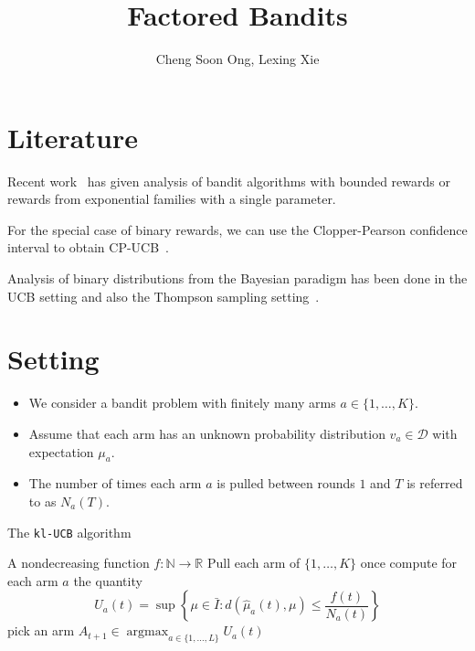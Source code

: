 \documentclass[a4paper,11pt]{article}
\title{Factored Bandits}
\author{Cheng Soon Ong, Lexing Xie}
\newcommand{\NN}{\mathbb{N}}
\newcommand{\RR}{\mathbb{R}}
\DeclareMathOperator{\argmax}{\mathrm{argmax}}
\newcommand{\muhat}{\widehat{\mu}}
\newcommand{\Dcal}{\mathcal{D}}
\begin{document}
\maketitle

\section{Literature}

Recent work~\cite{garivier11kluabs,maillard11finama,cappe13kulucb} has
given analysis of bandit algorithms with bounded rewards or rewards
from exponential families with a single parameter.

For the special case of binary rewards, we can use the Clopper-Pearson
confidence interval to obtain CP-UCB~\cite{garivier11kluabs}.

Analysis of binary distributions from the Bayesian paradigm has been
done in the UCB setting and also the Thompson sampling
setting~\cite{kaufmann12bayucb,kaufmann12thosao,korda13thosde}.


\section{Setting}

\begin{itemize}
\item We consider a bandit problem with finitely many arms
  $a\in\{1,\ldots,K\}$.
\item Assume that each arm has an unknown probability distribution
  $v_a\in\Dcal$ with expectation $\mu_a$.
\item The number of times each arm $a$ is pulled between rounds $1$
  and $T$ is referred to as $N_a(T)$.
\end{itemize}

\begin{algorithm}
  \label{alg:kl-UCB}
  \caption{The \texttt{kl-UCB} algorithm \cite[Algorithm 2]{cappe13kulucb}}
  \begin{algorithmic}
    \Require A nondecreasing function $f:\NN\to\RR$
    \State Pull each arm of $\{1, \ldots, K\}$ once
    \State compute for each arm $a$ the quantity
    \begin{equation}
      \label{eq:ucb}
      U_a(t) = \sup\left\{
        \mu\in\bar{I}: d(\muhat_a(t), \mu) \leqslant \frac{f(t)}{N_a(t)}
      \right\}
    \end{equation}
    \State pick an arm
    $A_{t+1}\in \argmax_{a\in\{1,\ldots,L\}} U_a(t)$
    \EndFor
  \end{algorithmic}
\end{algorithm}
\end{document}
